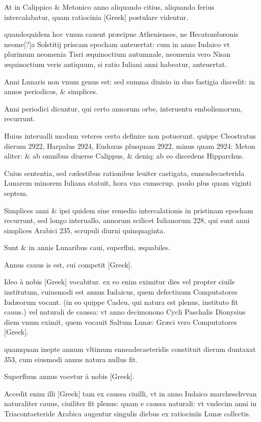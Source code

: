 \begin{parnumbers}

At in Calippico \& Metonico anno aliquando citius, aliquando ferius  intercalabatur, quam ratiocinia \textgreek{[Greek]} postulare videntur.

quandoquidem hoc vnum cauent præcipue Athenienses, ne Hecatombæonis neome[?]a Solstitij priscam epocham anteuertat: cum in anno Iudaico vt plurimum neomenia Tisri æquinoctium autumnale, neomenia vero Nisan æquinoctium veris antiquum, si ratio Iuliani anni habeatur, anteuertat.

Anni Lunaris non vnum genus est: sed summa diuisio in duo fastigia discedit: in annos periodicos, \& simplices.

Anni periodici dicuntur, qui certo annorum orbe, interuentu embolismorum, recurrunt.

Huius interualli modum veteres certo definire non potuerunt. quippe Cleostratus dierum 2922, Harpalus  2924, Eudoxus plusquam 2922, minus quam 2924: Meton aliter: \& ab omnibus diuerse Calippus, \& deniq; ab eo discedens Hipparchus.

Cuius sententia, sed cælestibus rationibus leuiter castigata, enneadecaeterida Lunarem minorem Iuliana statuit, hora vna cumscrup. paulo plus quam viginti septem.

Simplices anni \& ipsi quidem sine remedio intercalationis in pristinam epocham recurrunt, sed longo interuallo, annorum scilicet Iulianorum 228, qui sunt anni simplices Arabici 235, scrupuli diurni quinquaginta.

Sunt \& in annis Lunaribus caui, superflui, æquabiles.

Annus cauus is est, cui competit \textgreek{[Greek]}.

Ideo à nobis \textgreek{[Greek]} vocabitur. ex eo enim eximitur dies vel propter ciuile institutum, cuiusmodi est annus Iudaicus, quem defectiuum  Computatores Iudæorum vocant. (in eo quippe Casleu, qui natura est plenus, instituto fit cauus.) vel naturali de caussa: vt anno decimonono Cycli Paschalis Dionysius diem vnum eximit, quem vocauit Saltum Lunæ: Græci vero Computatores \textgreek{[Greek]}.

quamquam inepte annum vltimum enneadecaeteridis constituit dierum duntaxat 353, cum eiusmodi annus natura nullus fit.

Superfluus annus vocetur à nobis \textgreek{[Greek]}.

Accedit enim illi \textgreek{[Greek]} tam ex caussa ciuilli, vt in anno Iudaico marcheschvvan naturaliter cauus, ciuiliter fit plenus: quam e caussa naturali: vt vndecim anni in Triacontaeteride Arabica augentur singulis diebus ex ratiociniis Lunæ collectis.


\end{parnumbers}
